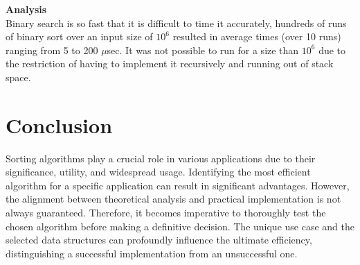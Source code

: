 \documentclass{article}
\begin{document}
\textbf{Analysis}\\

Binary search is so fast that it is difficult to time it accurately, hundreds of runs of binary sort over an input size of $10^6$ resulted in average times (over 10 runs) ranging from 5 to 200 $\mu$sec. It was not possible to run for a size than $10^6$ due to the restriction of having to implement it recursively and running out of stack space. 

\newpage
\section{Conclusion}

Sorting algorithms play a crucial role in various applications due to their significance, utility, and widespread usage. Identifying the most efficient algorithm for a specific application can result in significant advantages. However, the alignment between theoretical analysis and practical implementation is not always guaranteed. Therefore, it becomes imperative to thoroughly test the chosen algorithm before making a definitive decision. The unique use case and the selected data structures can profoundly influence the ultimate efficiency, distinguishing a successful implementation from an unsuccessful one.

\newpage

\nocite{*}
\printbibliography[] %
\end{document}
